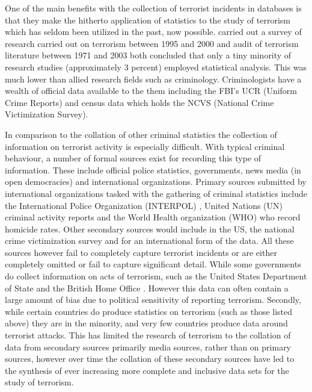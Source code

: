 One of the main benefits with the collection of terrorist incidents in databases is that they make the hitherto application of statistics to the study of terrorism which has seldom been utilized in the past, now possible. \citep{silke2001devil} carried out a survey of research carried out on terrorism between 1995 and 2000 and \citep{lum2006counter} audit of terrorism literature between 1971 and 2003 both concluded that only a tiny minority of research studies (approximately 3 percent) employed statistical analysis. This was much lower than allied research fields such as criminology. Criminologists have a wealth of official data available to the them including the FBI's UCR (Uniform Crime Reports) and census data which holds the NCVS (National Crime Victimization Survey).

In comparison to the collation of other criminal statistics the collection of information on terrorist activity is especially difficult. With typical criminal behaviour, a number of formal sources exist for recording this type of information. These include official police statistics, governments, news media (in open democracies) and  international organizations. Primary sources submitted by international organizations tasked with the gathering of criminal statistics include the International Police Organization (INTERPOL) \citep{bresler1992interpol}, United Nations (UN) criminal activity reports \citep{united2013global} and the World Health organization (WHO) who record homicide rates. Other secondary sources would include in the US, the national crime victimization survey and for an international form of the data. All these sources however fail to completely capture terrorist incidents or  are either completely omitted or fail to capture significant detail. While some governments do collect  information on acts of terrorism, such as the United States Department of State and the British Home Office \citep{Homeoffice2016}. However this data can often contain a large amount of bias due to political sensitivity of reporting terrorism. Secondly, while certain countries do produce  statistics on terrorism (such as those listed above) they are in the minority, and very few countries produce data around terrorist attacks. This has limited the research of terrorism to the collation of data from secondary sources primarily media sources, rather than on primary sources, however over time the collation of these secondary sources have led to the synthesis of ever increasing more complete and inclusive data sets for the study of terrorism.

